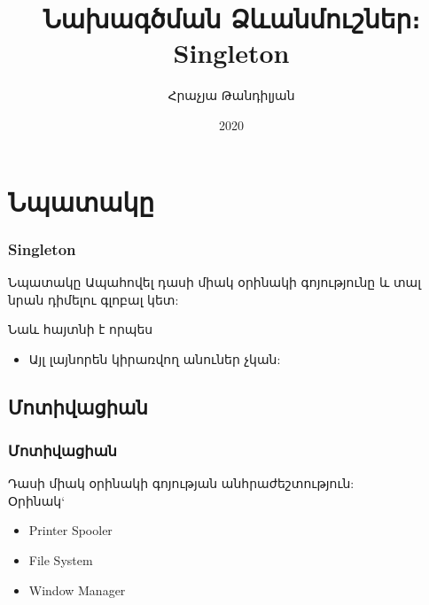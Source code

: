 \documentclass{beamer}
\begin{document}
\title[Singleton]{Նախագծման Ձևանմուշներ։ Singleton}
\author[Հրաչյա Թանդիլյան\copyright]{Հրաչյա Թանդիլյան}
\date{2020}

\begin{frame}
\titlepage
\end{frame}

\section{Նպատակը}
\begin{frame}\frametitle{Singleton}
\begin{block}{Նպատակը}
    Ապահովել դասի միակ օրինակի գոյությունը և տալ նրան դիմելու գլոբալ կետ:
\end{block}
\vfill
Նաև հայտնի է որպես
\begin{itemize}
    \item Այլ լայնորեն կիրառվող անուներ չկան:
\end{itemize}
\end{frame}

\subsection{Մոտիվացիան}
\begin{frame}\frametitle{Մոտիվացիան}
Դասի միակ օրինակի գոյության անհրաժեշտություն: \\
\vfill
Օրինակ`
\vfill
\begin{itemize}
    \item Printer Spooler \vfill
    \item File System \vfill
    \item Window Manager
\end{itemize}
\end{frame}
\end{document}
